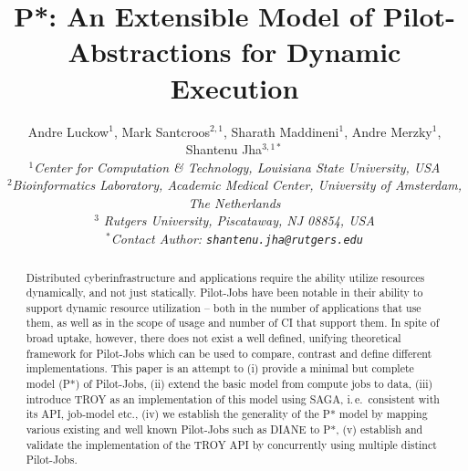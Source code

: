 \documentclass[conference,final]{IEEEtran}
\title{P*: An Extensible Model of Pilot-Abstractions for Dynamic Execution}
\date{}
\newcommand{\up}{\vspace*{-1em}}
\newcommand{\upp}{\vspace*{-0.5em}}
\begin{document}
\ifpdf
{}
\else
{}
\fi

\author{
  Andre Luckow$^{1}$, Mark Santcroos$^{2,1}$, Sharath Maddineni$^{1}$, Andre Merzky$^{1}$, Shantenu Jha$^{3,1*}$\\
  \small{\emph{$^{1}$Center for Computation \& Technology, Louisiana State University, USA}}\\
 \small{\emph{$^{2}$Bioinformatics Laboratory, Academic Medical Center, University of Amsterdam, The Netherlands}}\\
 \small{\emph{$^{3}$ Rutgers University, Piscataway, NJ 08854, USA}}\\
  \small{\emph{$^{*}$Contact Author: \texttt{shantenu.jha@rutgers.edu}}}\\
  \up\up\up\up }

\maketitle

\begin{abstract}
  Distributed cyberinfrastructure and applications require the ability
  utilize resources dynamically, and not just statically.  Pilot-Jobs
  have been notable in their ability to support dynamic resource
  utilization -- both in the number of applications that use them, as
  well as in the scope of usage and number of CI that support them.
  In spite of broad uptake, however, there does not exist a well
  defined, unifying theoretical framework for Pilot-Jobs which can be
  used to compare, contrast and define different implementations. This
  paper is an attempt to (i) provide a minimal but complete model (P*)
  of Pilot-Jobs, (ii) extend the basic model from compute jobs to
  data, (iii) introduce TROY as an implementation of this model using
  SAGA, i.\,e.\ consistent with its API, job-model etc., (iv) we
  establish the generality of the P* model by mapping various existing
  and well known Pilot-Jobs such as DIANE to P*, (v) establish and
  validate the implementation of the TROY API by concurrently using
  multiple distinct Pilot-Jobs.\upp\upp\upp\upp
\end{abstract}
\end{document}
